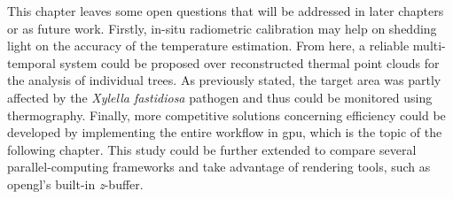 This chapter leaves some open questions that will be addressed in later chapters or as future work. Firstly, in-situ radiometric calibration may help on shedding light on the accuracy of the temperature estimation. From here, a reliable multi-temporal system could be proposed over reconstructed thermal point clouds for the analysis of individual trees. As previously stated, the target area was partly affected by the \textit{Xylella fastidiosa} pathogen and thus could be monitored using thermography. Finally, more competitive solutions concerning efficiency could be developed by implementing the entire workflow in \acrshort{gpu}, which is the topic of the following chapter. This study could be further extended to compare several parallel-computing frameworks and take advantage of rendering tools, such as \acrshort{opengl}'s built-in \textit{z}-buffer.